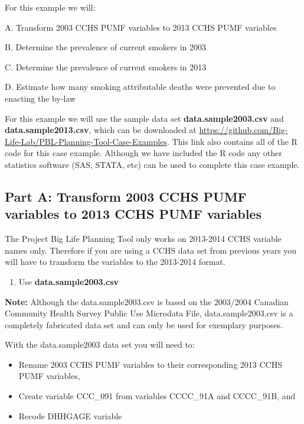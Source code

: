 \documentclass[]{book}
\providecommand{\tightlist}{%
  \setlength{\itemsep}{0pt}\setlength{\parskip}{0pt}}
\begin{document}
For this example we will:

A. Transform 2003 CCHS PUMF variables to 2013 CCHS PUMF variables

B. Determine the prevalence of current smokers in 2003

C. Determine the prevalence of current smokers in 2013

D. Estimate how many smoking attributable deaths were prevented due to
enacting the by-law

For this example we will use the sample data set
\textbf{data.sample2003.csv} and \textbf{data.sample2013.csv}, which can
be downloaded at
\url{https://github.com/Big-Life-Lab/PBL-Planning-Tool-Case-Examples}.
This link also contains all of the R code for this case example.
Although we have included the R code any other statistics software (SAS,
STATA, etc) can be used to complete this case example.

\subsection{Part A: Transform 2003 CCHS PUMF variables to 2013 CCHS PUMF
variables}\label{part-a-transform-2003-cchs-pumf-variables-to-2013-cchs-pumf-variables}

The Project Big Life Planning Tool only works on 2013-2014 CCHS variable
names only. Therefore if you are using a CCHS data set from previous
years you will have to transform the variables to the 2013-2014 format.

\begin{enumerate}
\def\labelenumi{\arabic{enumi}.}
\tightlist
\item
  Use \textbf{data.sample2003.csv}
\end{enumerate}

\textbf{Note:} Although the data.sample2003.csv is based on the
2003/2004 Canadian Community Health Survey Public Use Microdata File,
data.sample2003.csv is a completely fabricated data set and can only be
used for exemplary purposes.

With the data.sample2003 data set you will need to:

\begin{itemize}
\item
  Rename 2003 CCHS PUMF variables to their corresponding 2013 CCHS PUMF
  variables,
\item
  Create variable CCC\_091 from variables CCCC\_91A and CCCC\_91B, and
\item
  Recode DHHGAGE variable
\end{itemize}
\end{document}
